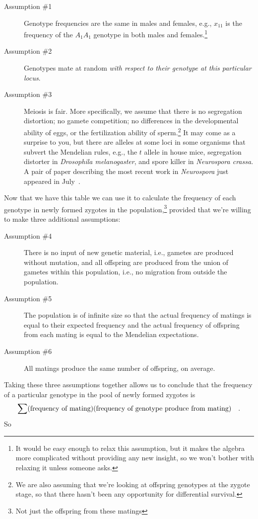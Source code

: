 \documentclass[12pt]{article}
\begin{document}
\begin{description}

\item[Assumption \#1] Genotype frequencies are the same in males and
  females, e.g., $x_{11}$ is the frequency of the $A_1A_1$ genotype in
  both males and females.\footnote{It would be easy enough to relax
    this assumption, but it makes the algebra more complicated without
    providing any new insight, so we won't bother with relaxing it
    unless someone asks.}

\item[Assumption \#2] Genotypes mate at random {\it with respect to
  their genotype at this particular locus}.

\item[Assumption \#3] Meiosis is fair. More specifically, we assume
  that there is no segregation distortion; no gamete competition; no
  differences in the developmental ability of eggs, or the
  fertilization ability of sperm.\footnote{We are also assuming that
    we're looking at offspring genotypes at the zygote stage, so that
    there hasn't been any opportunity for differential survival.} It
  may come as a surprise to you, but there are alleles at some loci in
  some organisms that subvert the Mendelian rules, e.g., the $t$
  allele in house mice, segregation distorter in {\it Drosophila
    melanogaster}, and spore killer in {\it Neurospora crassa\/}. A
  pair of paper describing the most recent work in {\it Neurospora\/}
  just appeared in July~\cite{Hammond-etal-2012,Saupe-2012}.

\end{description}
Now that we have this table we can use it to calculate the frequency
of each genotype in newly formed zygotes in the
population,\footnote{Not just the offspring from these matings}
provided that we're willing to make three additional assumptions:

\begin{description}

\item[Assumption \#4] There is no input of new genetic material, i.e.,
gametes are produced without mutation, and all offspring are produced
from the union of gametes within this population, i.e., no migration
from outside the population.

\item[Assumption \#5] The population is of infinite size so that the
actual frequency of matings is equal to their expected frequency and
the actual frequency of offspring from each mating is equal to the
Mendelian expectations.

\item[Assumption \#6] All matings produce the same number of
offspring, on average. 

\end{description}
Taking these three assumptions together allows us to conclude that the
frequency of a particular genotype in the pool of newly formed zygotes
is
\[
\sum(\hbox{frequency of mating})(\hbox{frequency of genotype produce
  from mating}) \quad .
\]
So
\end{document}
